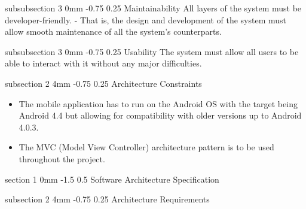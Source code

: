 \documentclass[12pt]{article}
\makeatletter
\renewcommand{\section}{\@startsection
   {section}%
   {1}%
   {0mm}%
   {-1.5\baselineskip}%
   {0.5\baselineskip}%
   {\sffamily\bfseries\upshape\normalsize}}%
\renewcommand{\subsection}{\@startsection
   {subsection}%
   {2}%
   {4mm}%
   {-0.75\baselineskip}%
   {0.25\baselineskip}%
   {\rmfamily\normalfont\scshape\normalsize}}%
\renewcommand{\subsubsection}{\@startsection
   {subsubsection}%
   {3}%
   {0mm}%
   {-0.75\baselineskip}%
   {0.25\baselineskip}%
   {\rmfamily\normalfont\slshape\normalsize}}%
\makeatother
\begin{document}
               					\subsubsection{Maintainability}
					                  	All layers of the system must be developer-friendly. - That is, the design and development of the system must allow smooth maintenance of all the system's counterparts.
       						    
       						    \subsubsection{Usability}
			    	                  	The system must allow all users to be able to interact with it without any major difficulties.
       						    	                  	
                
                		\subsection{Architecture Constraints}
                				
                				\begin{itemize}
                						\item The mobile application has to run on the Android OS with the target being Android 4.4 but allowing for compatibility with older versions up to Android 4.0.3. 
                						\item The MVC (Model View Controller) architecture pattern is to be used throughout the project.
                				\end{itemize}
               
                \section{Software Architecture Specification}
                
               		 \subsection{Architecture Requirements}
               		   
\end{document}

